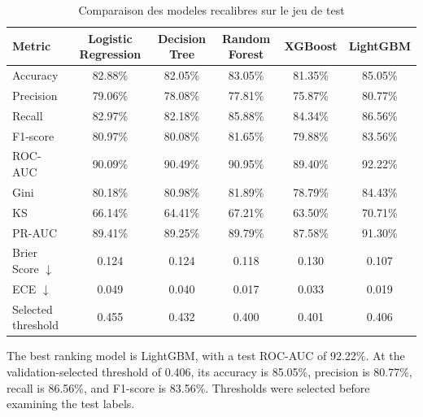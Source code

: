 \begin{table}[htbp]
\centering
\caption{Comparaison des modeles recalibres sur le jeu de test}
\label{tab:comparaison_modeles}
\scriptsize
\setlength{\tabcolsep}{4pt}
\begin{tabular}{|l|c|c|c|c|c|}
\hline
\textbf{Metric} & \textbf{Logistic Regression} & \textbf{Decision Tree} & \textbf{Random Forest} & \textbf{XGBoost} & \textbf{LightGBM} \\
\hline
Accuracy & 82.88\% & 82.05\% & 83.05\% & 81.35\% & 85.05\% \\
\hline
Precision & 79.06\% & 78.08\% & 77.81\% & 75.87\% & 80.77\% \\
\hline
Recall & 82.97\% & 82.18\% & 85.88\% & 84.34\% & 86.56\% \\
\hline
F1-score & 80.97\% & 80.08\% & 81.65\% & 79.88\% & 83.56\% \\
\hline
ROC-AUC & 90.09\% & 90.49\% & 90.95\% & 89.40\% & 92.22\% \\
\hline
Gini & 80.18\% & 80.98\% & 81.89\% & 78.79\% & 84.43\% \\
\hline
KS & 66.14\% & 64.41\% & 67.21\% & 63.50\% & 70.71\% \\
\hline
PR-AUC & 89.41\% & 89.25\% & 89.79\% & 87.58\% & 91.30\% \\
\hline
Brier Score $\downarrow$ & 0.124 & 0.124 & 0.118 & 0.130 & 0.107 \\
\hline
ECE $\downarrow$ & 0.049 & 0.040 & 0.017 & 0.033 & 0.019 \\
\hline
Selected threshold & 0.455 & 0.432 & 0.400 & 0.401 & 0.406 \\
\hline
\end{tabular}
\end{table}

The best ranking model is LightGBM, with a test ROC-AUC of 92.22\%. At the validation-selected threshold of 0.406, its accuracy is 85.05\%, precision is 80.77\%, recall is 86.56\%, and F1-score is 83.56\%. Thresholds were selected before examining the test labels.
